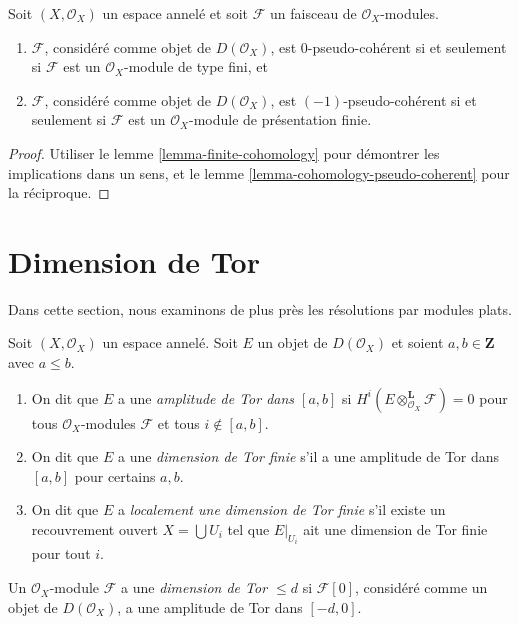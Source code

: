\begin{lemma}

\label{lemma-n-pseudo-module}
Soit $(X, \mathcal{O}_X)$ un espace annelé et soit $\mathcal{F}$ un faisceau de $\mathcal{O}_X$-modules.
\begin{enumerate}
\item $\mathcal{F}$, considéré comme objet de $D(\mathcal{O}_X)$, est $0$-pseudo-cohérent si et seulement si $\mathcal{F}$ est un $\mathcal{O}_X$-module de type fini, et
\item $\mathcal{F}$, considéré comme objet de $D(\mathcal{O}_X)$, est $(-1)$-pseudo-cohérent si et seulement si $\mathcal{F}$ est un $\mathcal{O}_X$-module de présentation finie.
\end{enumerate}

\end{lemma}

\begin{proof}

Utiliser le lemme \ref{lemma-finite-cohomology}
pour démontrer les implications dans un sens, et le lemme \ref{lemma-cohomology-pseudo-coherent} pour la réciproque.

\end{proof}





\section{Dimension de Tor}

\label{section-tor}

\noindent
Dans cette section, nous examinons de plus près les résolutions par modules plats.

\begin{definition}

\label{definition-tor-amplitude}

Soit $(X, \mathcal{O}_X)$ un espace annelé. Soit $E$ un objet de $D(\mathcal{O}_X)$ et soient $a, b \in \mathbf{Z}$ avec $a \leq b$.

\begin{enumerate}

\item On dit que $E$ a une {\it amplitude de Tor dans $[a, b]$}
si $H^i(E \otimes_{\mathcal{O}_X}^\mathbf{L} \mathcal{F}) = 0$
pour tous $\mathcal{O}_X$-modules $\mathcal{F}$ et tous $i \not \in [a, b]$.
\item On dit que $E$ a une {\it dimension de Tor finie}
s'il a une amplitude de Tor dans $[a, b]$ pour certains $a, b$.
\item On dit que $E$ a {\it localement une dimension de Tor finie}
s'il existe un recouvrement ouvert $X = \bigcup U_i$ tel que
$E|_{U_i}$ ait une dimension de Tor finie pour tout $i$.

\end{enumerate}

Un $\mathcal{O}_X$-module $\mathcal{F}$ a une {\it dimension de Tor $\leq d$}
si $\mathcal{F}[0]$, considéré comme un objet de $D(\mathcal{O}_X)$, a une amplitude de Tor dans $[-d, 0]$.

\end{definition}

